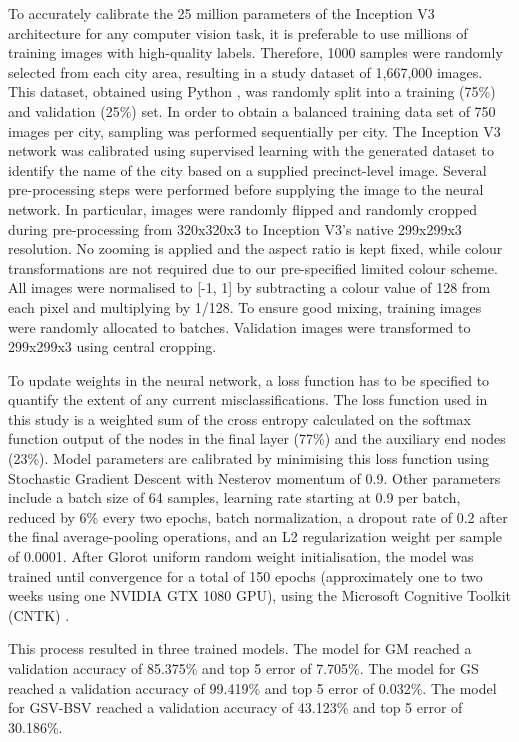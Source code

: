 \documentclass[sageh,times]{sagej}
\begin{document}
To accurately calibrate the 25 million parameters of the Inception V3 architecture for any computer vision task, it is preferable to use millions of training images with high-quality labels. Therefore, 1000 samples were randomly selected from each city area, resulting in a study dataset of 1,667,000 images. This dataset, obtained using Python \citep{Python2016}, was randomly split into a training (75\%) and validation (25\%) set. In order to obtain a balanced training data set of 750 images per city, sampling was performed sequentially per city.
The Inception V3 network was calibrated using supervised learning with the generated dataset to identify the name of the city based on a supplied precinct-level image. Several pre-processing steps were performed before supplying the image to the neural network. In particular, images were randomly flipped and randomly cropped during pre-processing from 320x320x3 to Inception V3's native 299x299x3 resolution. No zooming is applied and the aspect ratio is kept fixed, while colour transformations are not required due to our pre-specified limited colour scheme. All images were normalised to [-1, 1] by subtracting a colour value of 128 from each pixel and multiplying by 1/128. To ensure good mixing, training images were randomly allocated to batches. Validation images were transformed to 299x299x3 using central cropping.

To update weights in the neural network, a loss function has to be specified to quantify the extent of any current misclassifications. The loss function used in this study is a weighted sum of the cross entropy calculated on the softmax function output of the nodes in the final layer (77\%) and the auxiliary end nodes (23\%). Model parameters are calibrated by minimising this loss function using Stochastic Gradient Descent with Nesterov momentum of 0.9. Other parameters include a batch size of 64 samples, learning rate starting at 0.9 per batch, reduced by 6\% every two epochs, batch normalization, a dropout rate of 0.2 after the final average-pooling operations, and an L2 regularization weight per sample of 0.0001. After Glorot uniform random weight initialisation, the model was trained until convergence for a total of 150 epochs (approximately one to two weeks using one NVIDIA GTX 1080 GPU), using the Microsoft Cognitive Toolkit (CNTK) \citep{Yu2015}. 

This process resulted in three trained models. The model for GM reached a validation accuracy of 85.375\% and top 5 error of 7.705\%. The model for GS reached a validation accuracy of 99.419\% and top 5 error of 0.032\%. The model for GSV-BSV reached a validation accuracy of 43.123\% and top 5 error of 30.186\%.
\end{document}
